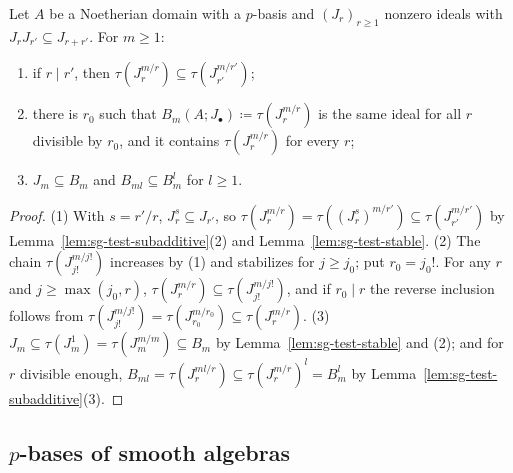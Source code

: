 \begin{lemma}\label{lem:sg-asymptotic}
\leanok
{}
Let $A$ be a Noetherian domain with a $p$-basis and $(J_r)_{r\ge1}$ nonzero ideals with $J_rJ_{r'}\subseteq J_{r+r'}$. For $m\ge1$:
\begin{enumerate}
\item if $r\mid r'$, then $\tau(J_r^{m/r})\subseteq\tau(J_{r'}^{m/r'})$;
\item there is $r_0$ such that $B_m(A;J_\bullet)\coloneqq\tau(J_r^{m/r})$ is the same ideal for all $r$ divisible by $r_0$, and it contains
$\tau(J_r^{m/r})$ for every $r$;
\item $J_m\subseteq B_m$ and $B_{ml}\subseteq B_m^l$ for $l\ge1$.
\end{enumerate}
\end{lemma}

\begin{proof}
(1) With $s=r'/r$, $J_r^s\subseteq J_{r'}$, so $\tau(J_r^{m/r})=\tau((J_r^s)^{m/r'})\subseteq\tau(J_{r'}^{m/r'})$ by Lemma~\ref{lem:sg-test-subadditive}(2) and
Lemma~\ref{lem:sg-test-stable}. (2) The chain $\tau(J_{j!}^{m/j!})$ increases by (1) and stabilizes for $j\ge j_0$; put $r_0=j_0!$. For any $r$ and
$j\ge\max(j_0,r)$, $\tau(J_r^{m/r})\subseteq\tau(J_{j!}^{m/j!})$, and if $r_0\mid r$ the reverse inclusion follows from
$\tau(J_{j!}^{m/j!})=\tau(J_{r_0}^{m/r_0})\subseteq\tau(J_r^{m/r})$. (3) $J_m\subseteq\tau(J_m^1)=\tau(J_m^{m/m})\subseteq B_m$ by
Lemma~\ref{lem:sg-test-stable} and (2); and for $r$ divisible enough,
$B_{ml}=\tau(J_r^{ml/r})\subseteq\tau(J_r^{m/r})^l=B_m^l$ by Lemma~\ref{lem:sg-test-subadditive}(3).
\end{proof}

\subsection{\texorpdfstring{$p$}{p}-bases of smooth algebras}\label{subsec:sg-smooth}

